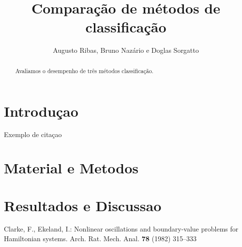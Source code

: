 
%
%


\title{Comparação de métodos de classificação}

\author{Augusto Ribas, Bruno Nazário e Doglas Sorgatto}


\maketitle

\begin{abstract}
Avaliamos o desempenho de três métodos classificação.
\end{abstract}
%
\section{Introduçao}

Exemplo de citaçao  \cite{clar:eke}

\section{Material e Metodos}
\section{Resultados e Discussao}


%
%
\begin{thebibliography}{5}
%
Clarke, F., Ekeland, I.:
Nonlinear oscillations and
boundary-value problems for Hamiltonian systems.
Arch. Rat. Mech. Anal. {\bf 78} (1982) 315--333
%
\end{thebibliography}
%

